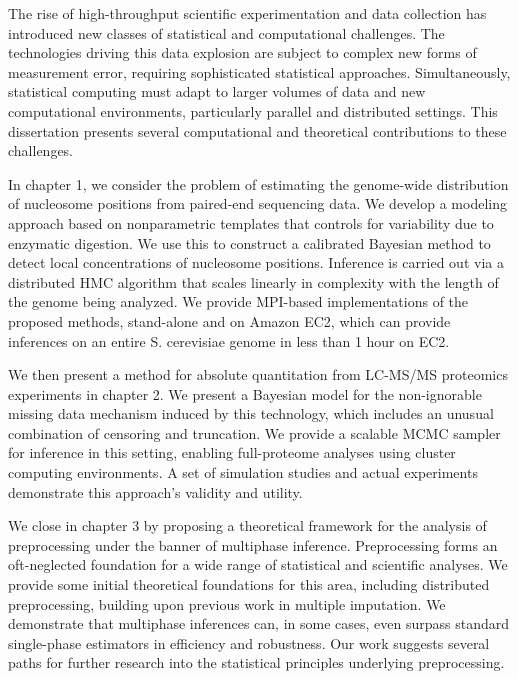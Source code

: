 
The rise of high-throughput scientific experimentation and data collection has introduced new classes of statistical and computational challenges.
The technologies driving this data explosion are subject to complex new forms of measurement error, requiring sophisticated statistical approaches.
Simultaneously, statistical computing must adapt to larger volumes of data and new computational environments, particularly parallel and distributed settings.
This dissertation presents several computational and theoretical contributions to these challenges.

In chapter 1, we consider the problem of estimating the genome-wide distribution of nucleosome positions from paired-end sequencing data.
We develop a modeling approach based on nonparametric templates that controls for variability due to enzymatic digestion.
We use this to construct a calibrated Bayesian method to detect local concentrations of nucleosome positions.
Inference is carried out via a distributed HMC algorithm that scales linearly in complexity with the length of the genome being analyzed.
We provide MPI-based implementations of the proposed methods, stand-alone and on Amazon EC2, which can provide inferences on an entire S. cerevisiae genome in less than 1 hour on EC2.

We then present a method for absolute quantitation from LC-MS/MS proteomics experiments in chapter 2.
We present a Bayesian model for the non-ignorable missing data mechanism induced by this technology, which includes an unusual combination of censoring and truncation.
We provide a scalable MCMC sampler for inference in this setting, enabling full-proteome analyses using cluster computing environments.
A set of simulation studies and actual experiments demonstrate this approach's validity and utility.

We close in chapter 3 by proposing a theoretical framework for the analysis of preprocessing under the banner of multiphase inference.
Preprocessing forms an oft-neglected foundation for a wide range of statistical and scientific analyses.
We provide some initial theoretical foundations for this area, including distributed preprocessing, building upon previous work in multiple imputation.
We demonstrate that multiphase inferences can, in some cases, even surpass standard single-phase estimators in efficiency and robustness.
Our work suggests several paths for further research into the statistical principles underlying preprocessing.
